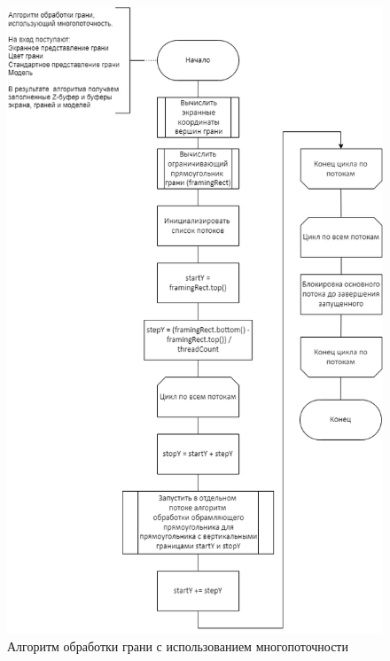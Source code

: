 \begin{figure}[h]
	\centering
	\includegraphics[scale=0.6]{inc/img/face.png}
	\caption{Алгоритм обработки грани с использованием многопоточности}
	\label{fig:face}
\end{figure} 

